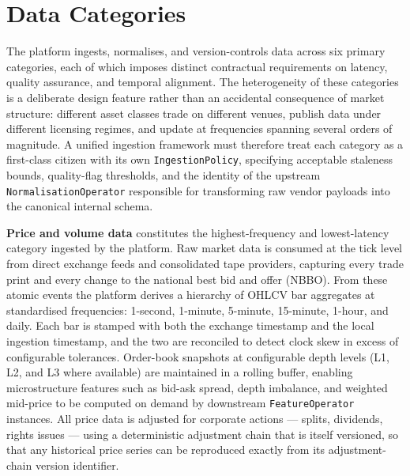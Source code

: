 \documentclass[12pt,openany]{book}
\numberwithin{equation}{chapter}
\theoremstyle{plain}
\theoremstyle{definition}
\theoremstyle{remark}
\begin{document}
\section{Data Categories}

The platform ingests, normalises, and version-controls data across six primary categories, each of which imposes distinct contractual requirements on latency, quality assurance, and temporal alignment. The heterogeneity of these categories is a deliberate design feature rather than an accidental consequence of market structure: different asset classes trade on different venues, publish data under different licensing regimes, and update at frequencies spanning several orders of magnitude. A unified ingestion framework must therefore treat each category as a first-class citizen with its own \texttt{IngestionPolicy}, specifying acceptable staleness bounds, quality-flag thresholds, and the identity of the upstream \texttt{NormalisationOperator} responsible for transforming raw vendor payloads into the canonical internal schema.

\textbf{Price and volume data} constitutes the highest-frequency and lowest-latency category ingested by the platform. Raw market data is consumed at the tick level from direct exchange feeds and consolidated tape providers, capturing every trade print and every change to the national best bid and offer (NBBO). From these atomic events the platform derives a hierarchy of OHLCV bar aggregates at standardised frequencies: 1-second, 1-minute, 5-minute, 15-minute, 1-hour, and daily. Each bar is stamped with both the exchange timestamp and the local ingestion timestamp, and the two are reconciled to detect clock skew in excess of configurable tolerances. Order-book snapshots at configurable depth levels (L1, L2, and L3 where available) are maintained in a rolling buffer, enabling microstructure features such as bid-ask spread, depth imbalance, and weighted mid-price to be computed on demand by downstream \texttt{FeatureOperator} instances. All price data is adjusted for corporate actions --- splits, dividends, rights issues --- using a deterministic adjustment chain that is itself versioned, so that any historical price series can be reproduced exactly from its adjustment-chain version identifier.
\end{document}
